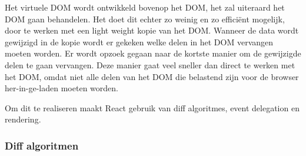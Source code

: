 	Het virtuele DOM wordt ontwikkeld bovenop het DOM, het zal uiteraard het DOM gaan behandelen. Het doet dit echter zo weinig en zo efficiënt mogelijk, door te werken met een light weight kopie van het DOM. Wanneer de data wordt gewijzigd in de kopie wordt er gekeken welke delen in het DOM vervangen moeten worden. Er wordt opzoek gegaan naar de kortste manier om de gewijzigde delen te gaan vervangen. Deze manier gaat veel sneller dan direct te werken met het DOM, omdat niet alle delen van het DOM die belastend zijn voor de browser her-in-ge-laden moeten worden.\citep{gackenheimer:react}
	
	Om dit te realiseren maakt React gebruik van diff algoritmes, event delegation en rendering.
	
	\subsubsection{Diff algoritmen}
		
